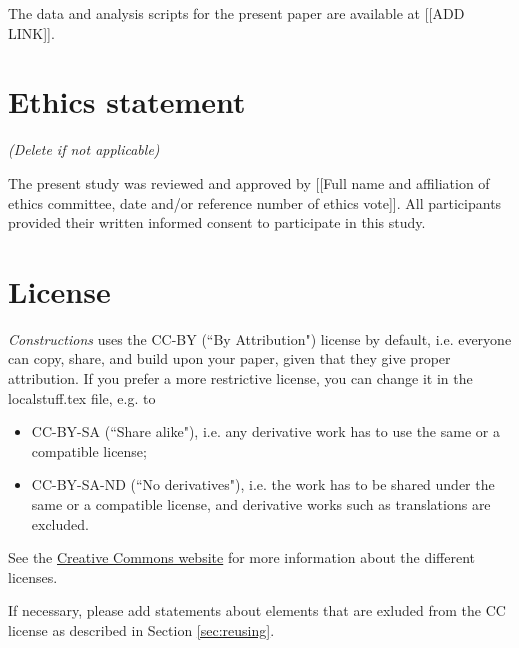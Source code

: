 The data and analysis scripts for the present paper are available at [[ADD LINK]].

\section*{Ethics statement}
\textit{(Delete if not applicable)}

\noindent The present study was reviewed and approved by [[Full name and affiliation of ethics committee, date and/or reference number of ethics vote]]. All participants provided their written informed consent to participate in this study.

\section*{License}
\doclicenseIcon \doclicenseText

\noindent \textit{Constructions} uses the CC-BY (``By Attribution") license by default, i.e. everyone can copy, share, and build upon your paper, given that they give proper attribution. If you prefer a more restrictive license, you can change it in the localstuff.tex file, e.g. to
\begin{itemize}
    \item CC-BY-SA (``Share alike"), i.e. any derivative work has to use the same or a compatible license;
    \item CC-BY-SA-ND (``No derivatives"), i.e. the work has to be shared under the same or a compatible license, and derivative works such as translations are excluded.
\end{itemize}

\noindent See the \href{https://creativecommons.org/}{Creative Commons website} for more information about the different licenses.

If necessary, please add statements about elements that are exluded from the CC license as described in Section \ref{sec:reusing}.




